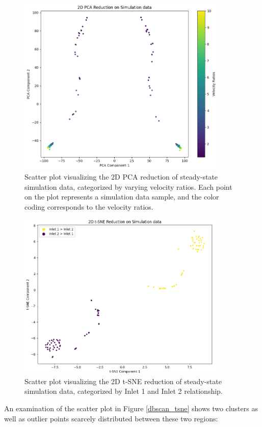 \begin{figure}[ht]
    \centering
    \includegraphics[width=10cm]{images/Clustering/pca_sim_cmap.png}
    \caption{Scatter plot visualizing the 2D PCA reduction of steady-state simulation data, categorized by varying velocity ratios. Each point on the plot represents a simulation data sample, and the color coding corresponds to the velocity ratios. }
    \label{pca_sim}
    \end{figure}
\begin{figure}[ht]
    \centering
    \includegraphics[width=10cm]{images/Clustering/tsne_inlet_cmp.png}
    \caption{Scatter plot visualizing the 2D t-SNE reduction of steady-state simulation data, categorized by Inlet 1 and Inlet 2 relationship.}
    \label{tsne_in}
    \end{figure}
An examination of the scatter plot in Figure \ref{dbscan_tsne} shows two clusters as well as outlier points scarcely distributed between these two regions:
